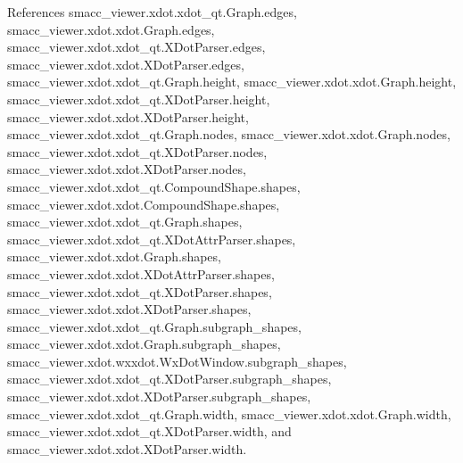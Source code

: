 References smacc\+\_\+viewer.\+xdot.\+xdot\+\_\+qt.\+Graph.\+edges, smacc\+\_\+viewer.\+xdot.\+xdot.\+Graph.\+edges, smacc\+\_\+viewer.\+xdot.\+xdot\+\_\+qt.\+X\+Dot\+Parser.\+edges, smacc\+\_\+viewer.\+xdot.\+xdot.\+X\+Dot\+Parser.\+edges, smacc\+\_\+viewer.\+xdot.\+xdot\+\_\+qt.\+Graph.\+height, smacc\+\_\+viewer.\+xdot.\+xdot.\+Graph.\+height, smacc\+\_\+viewer.\+xdot.\+xdot\+\_\+qt.\+X\+Dot\+Parser.\+height, smacc\+\_\+viewer.\+xdot.\+xdot.\+X\+Dot\+Parser.\+height, smacc\+\_\+viewer.\+xdot.\+xdot\+\_\+qt.\+Graph.\+nodes, smacc\+\_\+viewer.\+xdot.\+xdot.\+Graph.\+nodes, smacc\+\_\+viewer.\+xdot.\+xdot\+\_\+qt.\+X\+Dot\+Parser.\+nodes, smacc\+\_\+viewer.\+xdot.\+xdot.\+X\+Dot\+Parser.\+nodes, smacc\+\_\+viewer.\+xdot.\+xdot\+\_\+qt.\+Compound\+Shape.\+shapes, smacc\+\_\+viewer.\+xdot.\+xdot.\+Compound\+Shape.\+shapes, smacc\+\_\+viewer.\+xdot.\+xdot\+\_\+qt.\+Graph.\+shapes, smacc\+\_\+viewer.\+xdot.\+xdot\+\_\+qt.\+X\+Dot\+Attr\+Parser.\+shapes, smacc\+\_\+viewer.\+xdot.\+xdot.\+Graph.\+shapes, smacc\+\_\+viewer.\+xdot.\+xdot.\+X\+Dot\+Attr\+Parser.\+shapes, smacc\+\_\+viewer.\+xdot.\+xdot\+\_\+qt.\+X\+Dot\+Parser.\+shapes, smacc\+\_\+viewer.\+xdot.\+xdot.\+X\+Dot\+Parser.\+shapes, smacc\+\_\+viewer.\+xdot.\+xdot\+\_\+qt.\+Graph.\+subgraph\+\_\+shapes, smacc\+\_\+viewer.\+xdot.\+xdot.\+Graph.\+subgraph\+\_\+shapes, smacc\+\_\+viewer.\+xdot.\+wxxdot.\+Wx\+Dot\+Window.\+subgraph\+\_\+shapes, smacc\+\_\+viewer.\+xdot.\+xdot\+\_\+qt.\+X\+Dot\+Parser.\+subgraph\+\_\+shapes, smacc\+\_\+viewer.\+xdot.\+xdot.\+X\+Dot\+Parser.\+subgraph\+\_\+shapes, smacc\+\_\+viewer.\+xdot.\+xdot\+\_\+qt.\+Graph.\+width, smacc\+\_\+viewer.\+xdot.\+xdot.\+Graph.\+width, smacc\+\_\+viewer.\+xdot.\+xdot\+\_\+qt.\+X\+Dot\+Parser.\+width, and smacc\+\_\+viewer.\+xdot.\+xdot.\+X\+Dot\+Parser.\+width.


